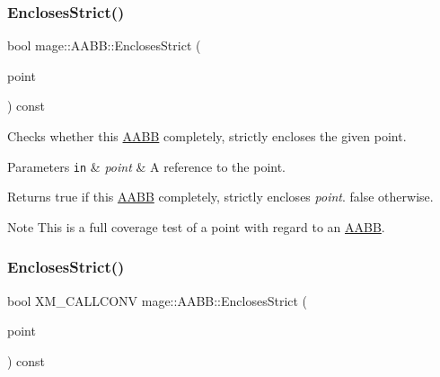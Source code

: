 \subsubsection{\texorpdfstring{Encloses\+Strict()}{EnclosesStrict()}\hspace{0.1cm}{\footnotesize\ttfamily [1/4]}}
{\footnotesize\ttfamily bool mage\+::\+A\+A\+B\+B\+::\+Encloses\+Strict (\begin{DoxyParamCaption}\item[{const \mbox{\hyperlink{structmage_1_1_point3}{Point3}} \&}]{point }\end{DoxyParamCaption}) const\hspace{0.3cm}{\ttfamily [noexcept]}}

Checks whether this \mbox{\hyperlink{classmage_1_1_a_a_b_b}{A\+A\+BB}} completely, strictly encloses the given point.


\begin{DoxyParams}[1]{Parameters}
\mbox{\tt in}  & {\em point} & A reference to the point. \\
\hline
\end{DoxyParams}
\begin{DoxyReturn}{Returns}
{\ttfamily true} if this \mbox{\hyperlink{classmage_1_1_a_a_b_b}{A\+A\+BB}} completely, strictly encloses {\itshape point}. {\ttfamily false} otherwise. 
\end{DoxyReturn}
\begin{DoxyNote}{Note}
This is a full coverage test of a point with regard to an \mbox{\hyperlink{classmage_1_1_a_a_b_b}{A\+A\+BB}}. 
\end{DoxyNote}
\mbox{\label{classmage_1_1_a_a_b_b_aa8946038ce497c79fa0ee34e87aa9aed}} 
\subsubsection{\texorpdfstring{Encloses\+Strict()}{EnclosesStrict()}\hspace{0.1cm}{\footnotesize\ttfamily [2/4]}}
{\footnotesize\ttfamily bool X\+M\+\_\+\+C\+A\+L\+L\+C\+O\+NV mage\+::\+A\+A\+B\+B\+::\+Encloses\+Strict (\begin{DoxyParamCaption}\item[{F\+X\+M\+V\+E\+C\+T\+OR}]{point }\end{DoxyParamCaption}) const\hspace{0.3cm}{\ttfamily [noexcept]}}


